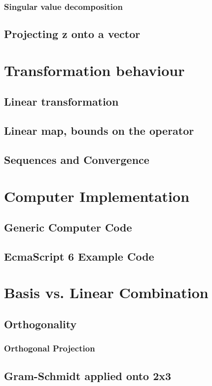 \documentclass[a4paper]{article}
\begin{document}
\subsubsection{Singular value decomposition} 
\subsection{Projecting z onto a vector}

\section{Transformation behaviour}
\subsection{Linear transformation}
\subsection{Linear map, bounds on the operator}
\subsection{Sequences and Convergence}

\section{Computer Implementation}
\subsection{Generic Computer Code}
\subsection{EcmaScript 6 Example Code}

\section{Basis vs. Linear Combination}
\subsection{Orthogonality}
\subsubsection{Orthogonal Projection}
\subsection{Gram-Schmidt applied onto 2x3}
\end{document}
